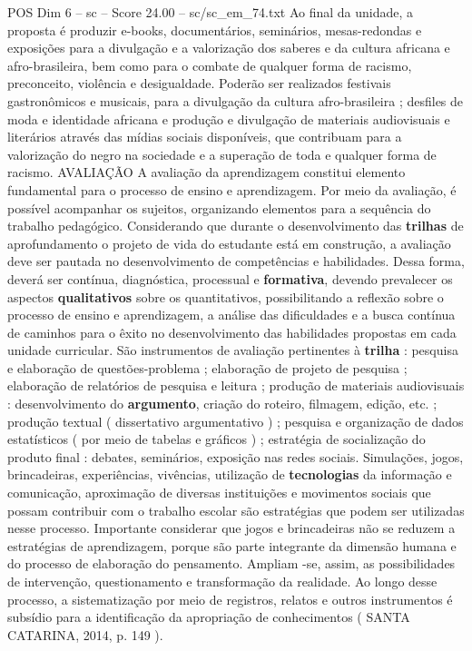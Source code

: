 \begin{textsample}{POS Dim 6 – sc – Score 24.00 – sc/sc\_em\_74.txt}
Ao final da unidade, a proposta é produzir e-books, documentários, seminários, mesas-redondas e exposições para a divulgação e a valorização dos saberes e da cultura africana e afro-brasileira, bem como para o combate de qualquer forma de racismo, preconceito, violência e desigualdade.
Poderão ser realizados festivais gastronômicos e musicais, para a divulgação da cultura afro-brasileira ; desfiles de moda e identidade africana e produção e divulgação de materiais audiovisuais e literários através das mídias sociais disponíveis, que contribuam para a valorização do negro na sociedade e a superação de toda e qualquer forma de racismo.
AVALIAÇÃO A avaliação da aprendizagem constitui elemento fundamental para o processo de ensino e aprendizagem.
Por meio da avaliação, é possível acompanhar os sujeitos, organizando elementos para a sequência do trabalho pedagógico.
Considerando que durante o desenvolvimento das \textbf{trilhas} de aprofundamento o projeto de vida do estudante está em construção, a avaliação deve ser pautada no desenvolvimento de competências e habilidades.
Dessa forma, deverá ser contínua, diagnóstica, processual e \textbf{formativa}, devendo prevalecer os aspectos \textbf{qualitativos} sobre os quantitativos, possibilitando a reflexão sobre o processo de ensino e aprendizagem, a análise das dificuldades e a busca contínua de caminhos para o êxito no desenvolvimento das habilidades propostas em cada unidade curricular.
São instrumentos de avaliação pertinentes à \textbf{trilha} : pesquisa e elaboração de questões-problema ; elaboração de projeto de pesquisa ; elaboração de relatórios de pesquisa e leitura ; produção de materiais audiovisuais : desenvolvimento do \textbf{argumento}, criação do roteiro, filmagem, edição, etc. ; produção textual ( dissertativo argumentativo ) ; pesquisa e organização de dados estatísticos ( por meio de tabelas e gráficos ) ; estratégia de socialização do produto final : debates, seminários, exposição nas redes sociais.
Simulações, jogos, brincadeiras, experiências, vivências, utilização de \textbf{tecnologias} da informação e comunicação, aproximação de diversas instituições e movimentos sociais que possam contribuir com o trabalho escolar são estratégias que podem ser utilizadas nesse processo.
Importante considerar que jogos e brincadeiras não se reduzem a estratégias de aprendizagem, porque são parte integrante da dimensão humana e do processo de elaboração do pensamento.
Ampliam -se, assim, as possibilidades de intervenção, questionamento e transformação da realidade.
Ao longo desse processo, a sistematização por meio de registros, relatos e outros instrumentos é subsídio para a identificação da apropriação de conhecimentos ( SANTA CATARINA, 2014, p. 149 ).

\end{textsample}
